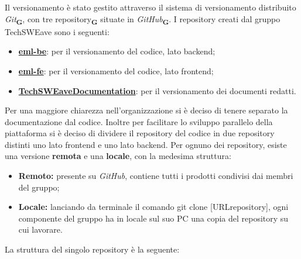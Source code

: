 Il versionamento è stato gestito attraverso il sistema di versionamento distribuito \textit{Git}\textsubscript{\textbf{G}}, con tre repository\textsubscript{\textbf{G}} situate in \textit{GitHub}\textsubscript{\textbf{G}}.
I repository creati dal gruppo TechSWEave sono i seguenti:
\begin{itemize}
    \item \textbf{\href{https://github.com/techsweave/eml-be.git}{eml-be}}: per il versionamento del codice, lato backend;
    \item \textbf{\href{https://github.com/techsweave/eml-fe.git}{eml-fe}}: per il versionamento del codice, lato frontend;
    \item \textbf{\href{https://github.com/techsweave/TechSWEaveDocumentation.git}{TechSWEaveDocumentation}}: per il versionamento dei documenti redatti.
\end{itemize}
Per una maggiore chiarezza nell'organizzazione si è deciso di tenere separato la documentazione dal codice. Inoltre per facilitare lo sviluppo parallelo della piattaforma si è deciso di dividere il repository del codice in due repository distinti uno lato frontend e uno lato backend.
Per ognuno dei repository, esiste una versione \textbf{remota} e una \textbf{locale}, con la medesima struttura:
\begin{itemize}
    \item \textbf{Remoto:} presente su \textit{GitHub}, contiene tutti i prodotti condivisi dai membri del gruppo;
    \item \textbf{Locale:} lanciando da terminale il comando {\selectfont git clone [URLrepository]}, ogni componente del gruppo ha in locale sul suo PC una copia del repository su cui lavorare.
\end{itemize}
La struttura del singolo repository è la seguente:
